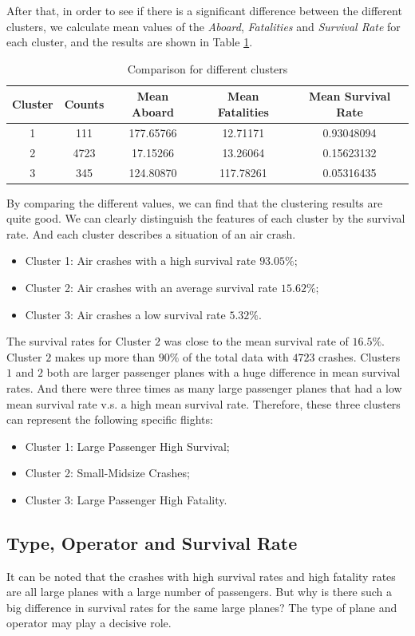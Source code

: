 \documentclass[12pt]{article}
\begin{document}
After that, in order to see if there is a significant difference between the different clusters, we calculate mean values of the \emph{Aboard}, \emph{Fatalities} and \emph{Survival Rate} for each cluster, and the results are shown in Table \ref{tab:comparison}. 
\begin{table}[ht]
\centering
\caption{Comparison for different clusters}
\label{tab:comparison}
\small
\begin{tabular}{ccccc}
\hline
\textbf{Cluster} & \textbf{Counts} & \textbf{Mean Aboard} & \textbf{Mean Fatalities} & \textbf{Mean Survival Rate} \\ \hline
1 & 111  & 177.65766 & 12.71171  & 0.93048094 \\
2 & 4723 & 17.15266  & 13.26064  & 0.15623132 \\
3 & 345  & 124.80870 & 117.78261 & 0.05316435 \\ \hline
\end{tabular}
\end{table}
By comparing the different values, we can find that the clustering results are quite good. We can clearly distinguish the features of each cluster by the survival rate. And each cluster describes a situation of an air crash. 
\begin{itemize}
    \item Cluster 1: Air crashes with a high survival rate $93.05\%$; 
    \item Cluster 2: Air crashes with an average survival rate $15.62\%$; 
    \item Cluster 3: Air crashes a low survival rate $5.32\%$. 
\end{itemize}
The survival rates for Cluster $2$ was close to the mean survival rate of $16.5\%$. Cluster $2$ makes up more than $90\%$ of the total data with $4723$ crashes. Clusters $1$ and $2$ both are larger passenger planes with a huge difference in mean survival rates. And there were three times as many large passenger planes that had a low mean survival rate v.s. a high mean survival rate. Therefore, these three clusters can represent the following specific flights: 
\begin{itemize}
    \item Cluster 1: Large Passenger High Survival; 
    \item Cluster 2: Small-Midsize Crashes; 
    \item Cluster 3: Large Passenger High Fatality. 
\end{itemize}

\subsection{Type, Operator and Survival Rate}
It can be noted that the crashes with high survival rates and high fatality rates are all large planes with a large number of passengers. But why is there such a big difference in survival rates for the same large planes? The type of plane and operator may play a decisive role. 
\end{document}
